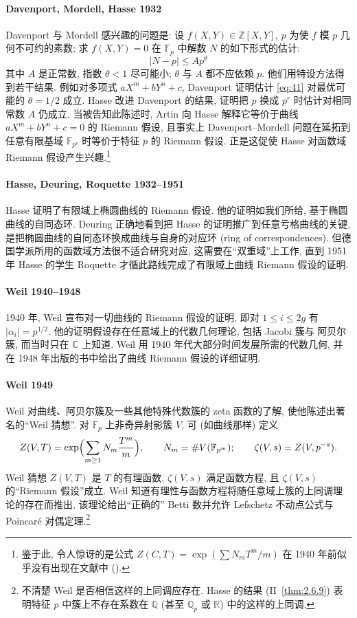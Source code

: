 \paragraph{Davenport, Mordell, Hasse 1932}
Davenport 与 Mordell 感兴趣的问题是: 设 $f(X, Y)\in\mathbb{Z}[X, Y]$, $p$ 为使 $f$ 模 $p$ 几何不可约的素数; 求 $f(X, Y) = 0$ 在 $\mathbb{F}_p$ 中解数 $N$ 的如下形式的估计:
\begin{equation} \label{eq:41}
|N - p|\le Ap^\theta
\tag{41}
\end{equation}
其中 $A$ 是正常数, 指数 $\theta < 1$ 尽可能小; $\theta$ 与 $A$ 都不应依赖 $p$. 他们用特设方法得到若干结果. 例如对多项式 $aX^m + bY^n + c$, Davenport 证明估计 \eqref{eq:41} 对最优可能的 $\theta = 1/2$ 成立. Hasse 改进 Davenport 的结果, 证明把 $p$ 换成 $p^r$ 时估计对相同常数 $A$ 仍成立. 当被告知此陈述时, Artin 向 Hasse 解释它等价于曲线 $aX^m + bY^n + c = 0$ 的 Riemann 假设, 且事实上 Davenport--Mordell 问题在延拓到任意有限基域 $\mathbb{F}_{p^r}$ 时等价于特征 $p$ 的 Riemann 假设. 正是这促使 Hasse 对函数域 Riemann 假设产生兴趣.\footnote{鉴于此, 令人惊讶的是公式 $Z(C, T) = \exp(\sum N_mT^m/m)$ 在 1940 年前似乎没有出现在文献中 (\cite[2.3]{oort2016}).}

\paragraph{Hasse, Deuring, Roquette 1932--1951}
Hasse 证明了有限域上椭圆曲线的 Riemann 假设. 他的证明如我们所给, 基于椭圆曲线的自同态环. Deuring 正确地看到把 Hasse 的证明推广到任意亏格曲线的关键, 是把椭圆曲线的自同态环换成曲线与自身的对应环 (ring of correspondences). 但德国学派所用的函数域方法很不适合研究对应, 这需要在``双重域''上工作, 直到 1951 年 Hasse 的学生 Roquette 才循此路线完成了有限域上曲线 Riemann 假设的证明.

\paragraph{Weil 1940--1948}
1940 年, Weil 宣布对一切曲线的 Riemann 假设的证明, 即对 $1\le i\le 2g$ 有 $|\alpha_i| = p^{1/2}$. 他的证明假设存在任意域上的代数几何理论, 包括 Jacobi 簇与 阿贝尔簇, 而当时只在 $\mathbb{C}$ 上知道. Weil 用 1940 年代大部分时间发展所需的代数几何, 并在 1948 年出版的书中给出了曲线 Riemann 假设的详细证明.

\paragraph{Weil 1949}
Weil 对曲线、阿贝尔簇及一些其他特殊代数簇的 zeta 函数的了解, 使他陈述出著名的``Weil 猜想''. 对 $\mathbb{F}_p$ 上非奇异射影簇 $V$, 可 (如曲线那样) 定义
\[
Z(V, T) = \exp\Bigl(\sum_{m\ge 1}N_m\frac{T^m}{m}\Bigr), \qquad N_m = \#V(\mathbb{F}_{p^m}); \qquad
\zeta(V, s) = Z(V, p^{-s}).
\]
Weil 猜想 $Z(V, T)$ 是 $T$ 的有理函数, $\zeta(V, s)$ 满足函数方程, 且 $\zeta(V, s)$ 的``Riemann 假设''成立. Weil 知道有理性与函数方程将随任意域上簇的上同调理论的存在而推出, 该理论给出``正确的'' Betti 数并允许 Lefschetz 不动点公式与 Poincar\'e 对偶定理.\footnote{不清楚 Weil 是否相信这样的上同调应存在. Hasse 的结果 (II~\ref{thm:2.6.9}) 表明特征 $p$ 中簇上不存在系数在 $\mathbb{Q}$ (甚至 $\mathbb{Q}_p$ 或 $\mathbb{R}$) 中的这样的上同调.}

